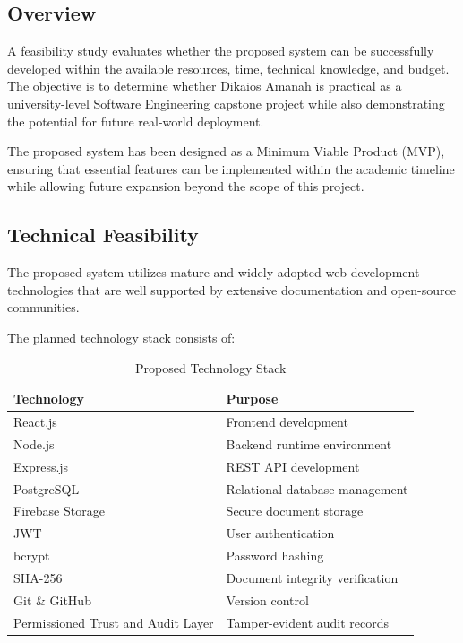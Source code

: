 \subsection{Overview}

A feasibility study evaluates whether the proposed system can be successfully developed within the available resources, time, technical knowledge, and budget. The objective is to determine whether Dikaios Amanah is practical as a university-level Software Engineering capstone project while also demonstrating the potential for future real-world deployment.

The proposed system has been designed as a Minimum Viable Product (MVP), ensuring that essential features can be implemented within the academic timeline while allowing future expansion beyond the scope of this project.


\subsection{Technical Feasibility}

The proposed system utilizes mature and widely adopted web development technologies that are well supported by extensive documentation and open-source communities.

The planned technology stack consists of:

\begin{table}[H]
\centering
\begin{tabular}{|p{5cm}|p{8cm}|}
\hline
\textbf{Technology} & \textbf{Purpose} \\
\hline
React.js & Frontend development \\
\hline
Node.js & Backend runtime environment \\
\hline
Express.js & REST API development \\
\hline
PostgreSQL & Relational database management \\
\hline
Firebase Storage & Secure document storage \\
\hline
JWT & User authentication \\
\hline
bcrypt & Password hashing \\
\hline
SHA-256 & Document integrity verification \\
\hline
Git \& GitHub & Version control \\
\hline
Permissioned Trust and Audit Layer & Tamper-evident audit records \\
\hline
\end{tabular}
\caption{Proposed Technology Stack}
\end{table}

